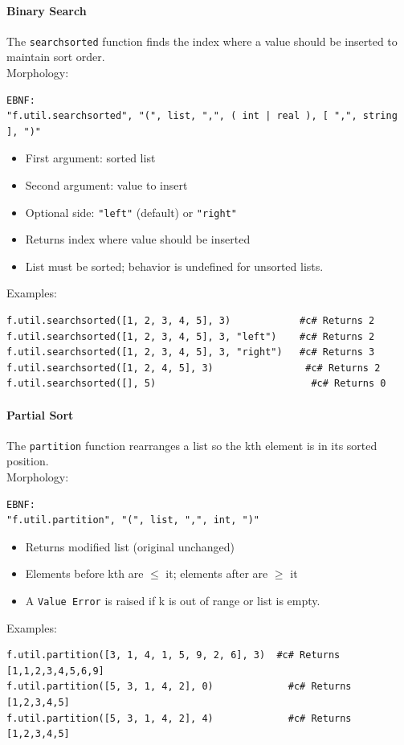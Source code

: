 \paragraph{Binary Search}
The \texttt{searchsorted} function finds the index where a value should be inserted to maintain sort order.\\
Morphology:
\begin{verbatim}
EBNF:
"f.util.searchsorted", "(", list, ",", ( int | real ), [ ",", string ], ")"
\end{verbatim}
\begin{itemize}
\item First argument: sorted list
\item Second argument: value to insert
\item Optional side: \texttt{"left"} (default) or \texttt{"right"}
\item Returns index where value should be inserted
\item List must be sorted; behavior is undefined for unsorted lists.
\end{itemize}
Examples:
\begin{verbatim}
f.util.searchsorted([1, 2, 3, 4, 5], 3)            #c# Returns 2
f.util.searchsorted([1, 2, 3, 4, 5], 3, "left")    #c# Returns 2
f.util.searchsorted([1, 2, 3, 4, 5], 3, "right")   #c# Returns 3
f.util.searchsorted([1, 2, 4, 5], 3)                #c# Returns 2
f.util.searchsorted([], 5)                           #c# Returns 0
\end{verbatim}

\paragraph{Partial Sort}
The \texttt{partition} function rearranges a list so the kth element is in its sorted position.\\
Morphology:
\begin{verbatim}
EBNF:
"f.util.partition", "(", list, ",", int, ")"
\end{verbatim}
\begin{itemize}
\item Returns modified list (original unchanged)
\item Elements before kth are $\leq$ it; elements after are $\geq$ it
\item A \texttt{Value Error} is raised if k is out of range or list is empty.
\end{itemize}
Examples:
\begin{verbatim}
f.util.partition([3, 1, 4, 1, 5, 9, 2, 6], 3)  #c# Returns [1,1,2,3,4,5,6,9]
f.util.partition([5, 3, 1, 4, 2], 0)             #c# Returns [1,2,3,4,5]
f.util.partition([5, 3, 1, 4, 2], 4)             #c# Returns [1,2,3,4,5]
\end{verbatim}

